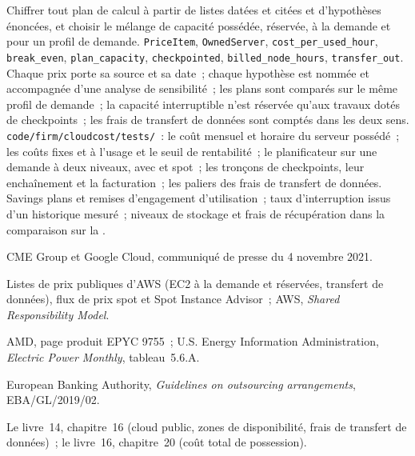 \begin{build}
 Chiffrer tout plan de calcul à partir de listes datées et citées et d'hypothèses énoncées, et choisir le mélange de capacité possédée, réservée, à la demande et
 pour un profil de demande.
 \texttt{PriceItem}, \texttt{OwnedServer}, \texttt{cost\_per\_used\_hour}, \texttt{break\_even}, \texttt{plan\_capacity},
\texttt{checkpointed}, \texttt{billed\_node\_hours}, \texttt{transfer\_out}.
 Chaque prix porte sa source et sa date~; chaque hypothèse est nommée et accompagnée d'une analyse de sensibilité~; les plans sont comparés sur le
même profil de demande~; la capacité interruptible n'est réservée qu'aux travaux dotés de checkpoints~; les frais de transfert de données sont comptés dans les deux sens.
 \texttt{code/firm/cloudcost/tests/}~: le coût mensuel et horaire du serveur possédé~; les coûts fixes et à l'usage et le
seuil de rentabilité~; le planificateur sur une demande à deux niveaux, avec  et spot~; les tronçons de checkpoints, leur enchaînement et la facturation~; les paliers des
frais de transfert de données.
 Savings plans et remises d'engagement d'utilisation~; taux d'interruption issus d'un historique mesuré~; niveaux de stockage et frais de récupération dans
la comparaison sur la .
\end{build}

\begin{omsources}
\item CME Group et Google Cloud, communiqué de presse du 4 novembre 2021.
\item Listes de prix publiques d'AWS (EC2 à la demande et réservées, transfert de données), flux de prix spot et Spot Instance Advisor~; AWS, \emph{Shared
Responsibility Model}.
\item AMD, page produit EPYC 9755~; U.S. Energy Information Administration, \emph{Electric Power Monthly}, tableau~5.6.A.
\item European Banking Authority, \emph{Guidelines on outsourcing arrangements}, EBA/GL/2019/02.
\item Le livre~14, chapitre~16 (cloud public, zones de disponibilité, frais de transfert de données)~; le livre~16, chapitre~20 (coût total de possession).
\end{omsources}

